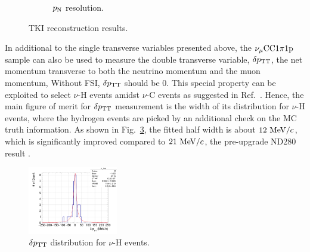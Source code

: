 \begin{figure}[!htb]
\begin{subfigure}{0.45\textwidth}
            \caption{$p_\textrm{N}$ resolution.}
            \label{fig:1pi-pn-res}
       \end{subfigure}
       \caption{TKI reconstruction results.}
       \label{fig:1pi-tki-res}
    \end{figure}

    In additional to the single transverse variables presented above, the $\nu_{\mu}\textrm{CC}1\pi1\textrm{p}$ sample can also be used to measure the double transverse variable, $\delta p_\textrm{TT}$, the net momentum transverse to both the neutrino momentum and the muon momentum,
    Without FSI, $\delta p_\textrm{TT}$ should be $0$. This special property can be exploited to select $\nu$-H events amidst $\nu$-C events as suggested in Ref.~\cite{dpttpaper}. 
    Hence, the main figure of merit for $\delta p_\textrm{TT}$ measurement is the width of its distribution for $\nu$-H events, where the hydrogen events are picked by an additional check on the MC truth information.
    As shown in Fig.~\ref{fig:dptt-hist}, the fitted half width is about $12~\textrm{MeV}/c$, which is significantly improved compared to $21~\textrm{MeV}/c$, the pre-upgrade ND280 result \cite{dpttpaper}.

    \begin{figure}[!htb] 
        \centering 		
        \includegraphics[width=0.35\textwidth]{figures/SFGpTPCmu_dptt_hist_al15_H_bin100_range500_Lfit.png}
        \caption{\label{fig:dptt-hist} $\delta p_\textrm{TT}$ distribution for $\nu$-H events.} 
    \end{figure}


